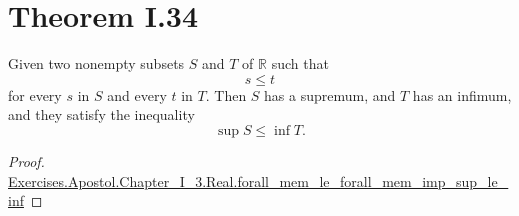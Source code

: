 \documentclass{article}
\newcommand{\ns}{Exercises.Apostol.Chapter\_I\_3.Real}
\newcommand{\link}[1]{\href{../Chapter_I_3.html\#\ns.#1}{\ns.#1}}
\begin{document}
\section*{Theorem I.34}%
\label{sec:theorem-i.34}

Given two nonempty subsets $S$ and $T$ of $\mathbb{R}$ such that
$$s \leq t$$
for every $s$ in $S$ and every $t$ in $T$. Then $S$ has a supremum, and $T$
has an infimum, and they satisfy the inequality
$$\sup{S} \leq \inf{T}.$$

\begin{proof}

  \link{forall\_mem\_le\_forall\_mem\_imp\_sup\_le\_inf}

\end{proof}
\end{document}
